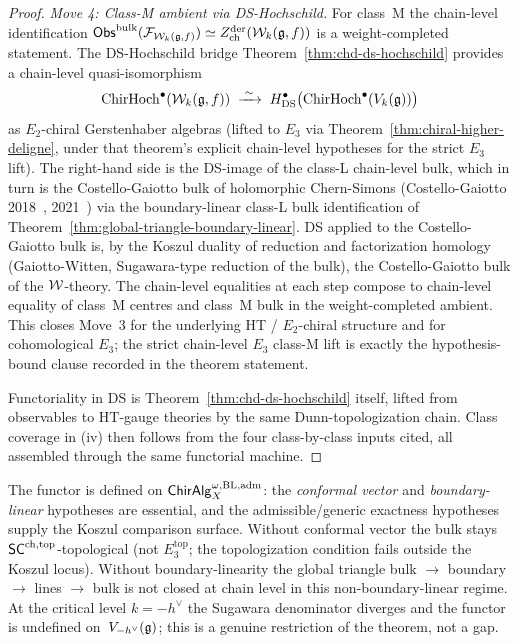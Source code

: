 \begin{proof}
\emph{Move 4: Class-M ambient via DS-Hochschild.}
For class~M the chain-level identification
$\mathsf{Obs}^{\mathrm{bulk}}(\mathcal{F}_{\mathcal{W}_k(\mathfrak{g},f)}) \simeq Z^{\mathrm{der}}_{\mathrm{ch}}(\mathcal{W}_k(\mathfrak{g},f))$
is a weight-completed statement. The DS-Hochschild bridge
Theorem~\ref*{thm:chd-ds-hochschild} provides a chain-level
quasi-isomorphism
\[
 \mathrm{ChirHoch}^\bullet(\mathcal{W}_k(\mathfrak{g}, f))
 \;\xrightarrow{\;\sim\;}\;
 H^\bullet_{\mathrm{DS}}\bigl(\mathrm{ChirHoch}^\bullet(V_k(\mathfrak{g}))\bigr)
\]
as $E_2$-chiral Gerstenhaber algebras (lifted to $E_3$ via
Theorem~\ref*{thm:chiral-higher-deligne}, under that theorem's
explicit chain-level hypotheses for the strict $E_3$ lift). The
right-hand side is the DS-image of the class-L chain-level bulk,
which in turn is the Costello-Gaiotto bulk of holomorphic Chern-Simons
(Costello-Gaiotto 2018~\cite{CostelloGaiotto2018},
2021~\cite{CostelloGaiotto2021}) via the boundary-linear class-L bulk
identification of Theorem~\ref*{thm:global-triangle-boundary-linear}.
DS applied to the
Costello-Gaiotto bulk is, by the Koszul duality of reduction and
factorization homology (Gaiotto-Witten, Sugawara-type reduction of
the bulk), the Costello-Gaiotto bulk of the $\mathcal{W}$-theory. The
chain-level equalities at each step compose to chain-level equality
of class~M centres and class~M bulk in the weight-completed ambient.
This closes Move~3 for the underlying HT / $E_2$-chiral structure and
for cohomological $E_3$; the strict chain-level $E_3$ class-M lift is
exactly the hypothesis-bound clause recorded in the theorem statement.

Functoriality in DS is Theorem~\ref*{thm:chd-ds-hochschild}
itself, lifted from observables to HT-gauge theories by the same
Dunn-topologization chain. Class coverage in (iv) then follows
from the four class-by-class inputs cited, all assembled through
the same functorial machine.
\end{proof}

\begin{remark}
\label{rem:uhf-scope}
The functor is defined on $\mathsf{ChirAlg}^{\omega,\mathrm{BL,adm}}_X$: the
\emph{conformal vector} and \emph{boundary-linear} hypotheses are
essential, and the admissible/generic exactness hypotheses supply the
Koszul comparison surface. Without conformal vector the bulk stays
$\mathsf{SC}^{\mathrm{ch},\mathrm{top}}$-topological (not $E_3^{\mathrm{top}}$; the topologization
condition fails outside the Koszul locus). Without boundary-linearity
the global triangle bulk $\to$ boundary $\to$ lines $\to$ bulk is not
closed at chain level in this non-boundary-linear regime. At the critical
level $k = -h^\vee$ the Sugawara denominator diverges and the
functor is undefined on~$V_{-h^\vee}(\mathfrak{g})$; this is a genuine
restriction of the theorem, not a gap.
\end{remark}

